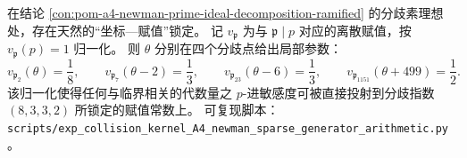 \begin{conclusion}\label{con:pom-a4-newman-normalized-local-parameters}
在结论 \ref{con:pom-a4-newman-prime-ideal-decomposition-ramified} 的分歧素理想处，存在天然的“坐标—赋值”锁定。
记 \(v_{\mathfrak p}\) 为与 \(\mathfrak p\mid p\) 对应的离散赋值，按 \(v_{\mathfrak p}(p)=1\) 归一化。
则 \(\theta\) 分别在四个分歧点给出局部参数：
\[
v_{\mathfrak p_2}(\theta)=\frac{1}{8},\qquad
v_{\mathfrak p_7}(\theta-2)=\frac{1}{3},\qquad
v_{\mathfrak p_{23}}(\theta-6)=\frac{1}{3},\qquad
v_{\mathfrak p_{1151}}(\theta+499)=\frac{1}{2}.
\]
该归一化使得任何与临界相关的代数量之 \(p\)-进敏感度可被直接投射到分歧指数 \((8,3,3,2)\) 所锁定的赋值常数上。
可复现脚本：\texttt{scripts/exp\_collision\_kernel\_A4\_newman\_sparse\_generator\_arithmetic.py}。
\end{conclusion}

